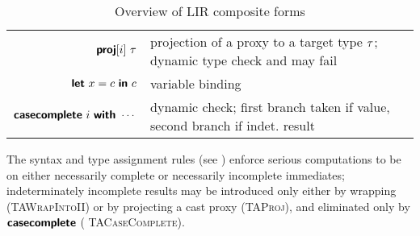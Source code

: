 \documentclass[index.tex]{subfiles}
\begin{document}
\begin{table}
\begin{center}
\begin{tabular}{rl}
      $\textsf{\textbf{proj}}[i]~ \tau$
        & projection of a proxy to a target type $\tau$; dynamic type check and may fail \\

      $\textsf{\textbf{{let}}}~ x = c ~\textsf{\textbf{{in}}}~ c$
        & variable binding \\

      $\textsf{\textbf{casecomplete}}~ i ~\textsf{\textbf{{with}}} ~\cdots$
        & dynamic check; first branch taken if value, second branch if indet. result
    \end{tabular}
  \end{center}
  \caption{Overview of LIR composite forms}
  \label{fig:lir-syntax-comp}
\end{table}

The syntax and type assignment rules (see ) enforce serious computations to be
on either necessarily complete or necessarily incomplete immediates; indeterminately incomplete
results may be introduced only either by wrapping (\textsc{\small TAWrapIntoII}) or by projecting a
cast proxy (\textsc{\small TAProj}), and eliminated only by $\textsf{\textbf{casecomplete}}$ (\textsc{\small
TACaseComplete}).
\end{document}

